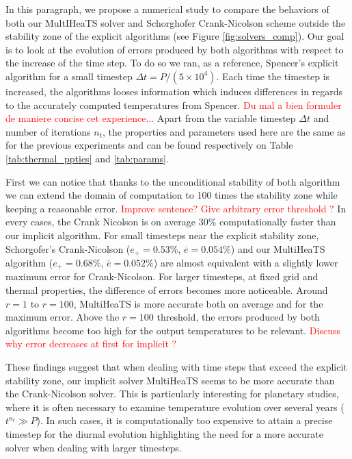\documentclass[]{interact}
\theoremstyle{plain}%
\theoremstyle{definition}
\theoremstyle{remark}
\begin{document}
In this paragraph, we propose a numerical study to compare the behaviors of both our MultIHeaTS solver and Schorghofer Crank-Nicolson scheme outside the stability zone of the explicit algorithms (see Figure \ref{fig:solvers_comp}).
Our goal is to look at the evolution of errors produced by both algorithms with respect to the increase of the time step. 
To do so we ran, as a reference, Spencer's explicit algorithm for a small timestep $\Delta t = P / (5 \times 10^4)$. Each time the timestep is increased, the algorithms looses information which induces differences in regards to the accurately computed temperatures from Spencer.
\textcolor{red}{Du mal a bien formuler de maniere concise cet experience...}
Apart from the variable timestep $\Delta t$ and number of iterations $n_t$, the properties and parameters used here are the same as for the previous experiments and can be found respectively on Table \ref{tab:thermal_ppties} and \ref{tab:params}.

First we can notice that thanks to the unconditional stability of both algorithm we can extend the domain of computation to 100 times the stability zone while keeping a reasonable error. \textcolor{red}{Improve sentence? Give arbitrary error threshold ?}
In every cases, the Crank Nicolson is on average 30\% computationally faster than our implicit algorithm.
For small timesteps near the explicit stability zone, Schorgofer's Crank-Nicolson ($e_+=0.53\%$, $\overline{e} = 0.054\%$) and our MultiHeaTS algorithm ($e_+=0.68\%$, $\overline{e} = 0.052\%$) are almost equivalent with a slightly lower maximum error for Crank-Nicolson. 
For larger timesteps, at fixed grid and thermal properties, the difference of errors becomes more noticeable. 
Around $r=1$ to $r=100$, MultiHeaTS is more accurate both on average and for the maximum error.
Above the $r=100$ threshold, the errors produced by both algorithms become too high for the output temperatures to be relevant.
\textcolor{red}{Discuss why error decreases at first for implicit ?}


These findings suggest that when dealing with time steps that exceed the explicit stability zone, our implicit solver MultiHeaTS seems to be more accurate than the Crank-Nicolson solver.
This is particularly interesting for planetary studies,  where it is often necessary to examine temperature evolution over several years ($t^{n_t} \gg P$). 
 In such cases, it is computationally too expensive to attain a precise timestep for the diurnal evolution highlighting the need for a more accurate solver when dealing with larger timesteps.
\end{document}
